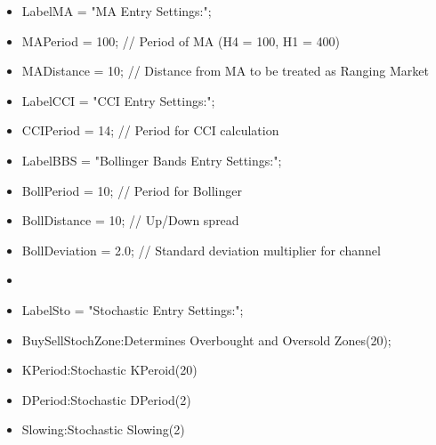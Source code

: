 \begin{itemize}
\item LabelMA             = "MA Entry Settings:";
\item MAPeriod            = 100;      // Period of MA (H4 = 100, H1 = 400)
\item MADistance          = 10;       // Distance from MA to be treated as Ranging Market

\item LabelCCI            = "CCI Entry Settings:";
\item CCIPeriod           = 14;       // Period for CCI calculation

\item LabelBBS            = "Bollinger Bands Entry Settings:";
\item BollPeriod          = 10;       // Period for Bollinger
\item BollDistance        = 10;       // Up/Down spread
\item BollDeviation       = 2.0;      // Standard deviation multiplier for channel
\item 
\item LabelSto            = "Stochastic Entry Settings:";
\item BuySellStochZone:Determines Overbought and Oversold Zones(20);      
\item KPeriod:Stochastic KPeroid(20)
\item DPeriod:Stochastic DPeriod(2)
\item Slowing:Stochastic Slowing(2)        


\end{itemize}
